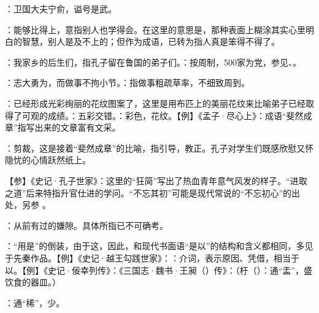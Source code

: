 {
\item {}：卫国大夫宁俞，谥号是武。
\item {}：能够比得上，意指别人也学得会。在这里的意思是，那种表面上糊涂其实心里明白的智慧，别人是及不上的；但作为成语，已转为指人真是笨得不得了。
}
{}


{
\begin{lyitemize}
\item {}：我家乡的后生们，指孔子留在鲁国的弟子们。：按周制，500家为党，参见、。%
\item {}：志大勇为，而做事不拘小节。：指做事粗疏草率，不细致周到。
\item {}：已经形成光彩绚丽的花纹图案了，这里是用布匹上的美丽花纹来比喻弟子已经取得了可观的成绩。：五彩交错。：彩色，花纹。【例】《孟子·尽心上》：成语“斐然成章”指写出来的文章富有文采。
\item {}：剪裁，这是接着“斐然成章”的比喻，指引导，教正。孔子对学生们既感欣慰又怀隐忧的心情跃然纸上。
\end{lyitemize}
【参】《史记·孔子世家》：这里的“狂简”写出了热血青年意气风发的样子。“进取之道”后来特指升官仕进的学问。“不忘其初”可能是现代常说的“不忘初心”的出处，另参  。 %
}
{}


{
\item {}：从前有过的嫌隙。具体所指已不可确考。
\item {}：“用是”的倒装，由于这，因此，和现代书面语“是以”的结构和含义都相同，多见于先秦作品。【例】《史记·越王勾践世家》：：介词，表示原因、凭借，相当于以。【例】《史记·佞幸列传》：《三国志·魏书·王昶（）传》：（杅（）：通“盂”，盛饮食的器皿。）
\item {}：通“稀”，少。
}
{}


